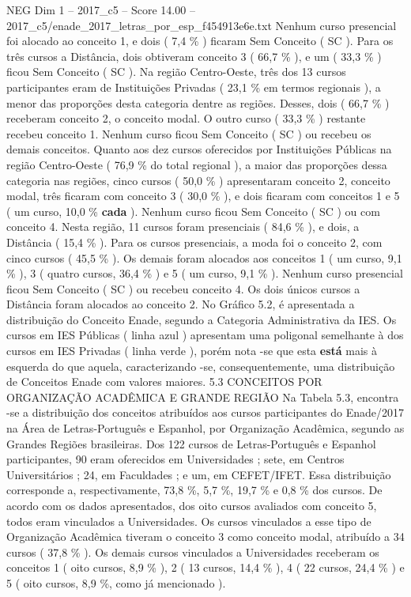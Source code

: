 \begin{textsample}{NEG Dim 1 – 2017\_c5 – Score 14.00 – 2017\_c5/enade\_2017\_letras\_por\_esp\_f454913e6e.txt}
Nenhum curso presencial foi alocado ao conceito 1, e dois ( 7,4 \% ) ficaram Sem Conceito ( SC ).
Para os três cursos a Distância, dois obtiveram conceito 3 ( 66,7 \% ), e um ( 33,3 \% ) ficou Sem Conceito ( SC ).
Na região Centro-Oeste, três dos 13 cursos participantes eram de Instituições Privadas ( 23,1 \% em termos regionais ), a menor das proporções desta categoria dentre as regiões.
Desses, dois ( 66,7 \% ) receberam conceito 2, o conceito modal.
O outro curso ( 33,3 \% ) restante recebeu conceito 1.
Nenhum curso ficou Sem Conceito ( SC ) ou recebeu os demais conceitos.
Quanto aos dez cursos oferecidos por Instituições Públicas na região Centro-Oeste ( 76,9 \% do total regional ), a maior das proporções dessa categoria nas regiões, cinco cursos ( 50,0 \% ) apresentaram conceito 2, conceito modal, três ficaram com conceito 3 ( 30,0 \% ), e dois ficaram com conceitos 1 e 5 ( um curso, 10,0 \% \textbf{cada} ).
Nenhum curso ficou Sem Conceito ( SC ) ou com conceito 4.
Nesta região, 11 cursos foram presenciais ( 84,6 \% ), e dois, a Distância ( 15,4 \% ).
Para os cursos presenciais, a moda foi o conceito 2, com cinco cursos ( 45,5 \% ).
Os demais foram alocados aos conceitos 1 ( um curso, 9,1 \% ), 3 ( quatro cursos, 36,4 \% ) e 5 ( um curso, 9,1 \% ).
Nenhum curso presencial ficou Sem Conceito ( SC ) ou recebeu conceito 4.
Os dois únicos cursos a Distância foram alocados ao conceito 2.
No Gráfico 5.2, é apresentada a distribuição do Conceito Enade, segundo a Categoria Administrativa da IES.
Os cursos em IES Públicas ( linha azul ) apresentam uma poligonal semelhante à dos cursos em IES Privadas ( linha verde ), porém nota -se que esta \textbf{está} mais à esquerda do que aquela, caracterizando -se, consequentemente, uma distribuição de Conceitos Enade com valores maiores. 5.3 CONCEITOS POR ORGANIZAÇÃO ACADÊMICA E GRANDE REGIÃO Na Tabela 5.3, encontra -se a distribuição dos conceitos atribuídos aos cursos participantes do Enade/2017 na Área de Letras-Português e Espanhol, por Organização Acadêmica, segundo as Grandes Regiões brasileiras.
Dos 122 cursos de Letras-Português e Espanhol participantes, 90 eram oferecidos em Universidades ; sete, em Centros Universitários ; 24, em Faculdades ; e um, em CEFET/IFET.
Essa distribuição corresponde a, respectivamente, 73,8 \%, 5,7 \%, 19,7 \% e 0,8 \% dos cursos.
De acordo com os dados apresentados, dos oito cursos avaliados com conceito 5, todos eram vinculados a Universidades.
Os cursos vinculados a esse tipo de Organização Acadêmica tiveram o conceito 3 como conceito modal, atribuído a 34 cursos ( 37,8 \% ).
Os demais cursos vinculados a Universidades receberam os conceitos 1 ( oito cursos, 8,9 \% ), 2 ( 13 cursos, 14,4 \% ), 4 ( 22 cursos, 24,4 \% ) e 5 ( oito cursos, 8,9 \%, como já mencionado ).

\end{textsample}
